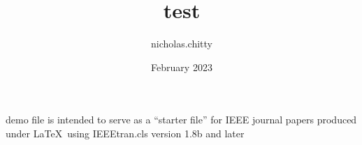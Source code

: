 \documentclass[journal]{IEEEtran}
\title{test}
\author{nicholas.chitty }
\date{February 2023}
\begin{document}
\maketitle

 demo file is intended to serve as a ``starter file''
for IEEE journal papers produced under \LaTeX\ using
IEEEtran.cls version 1.8b and later
\end{document}
